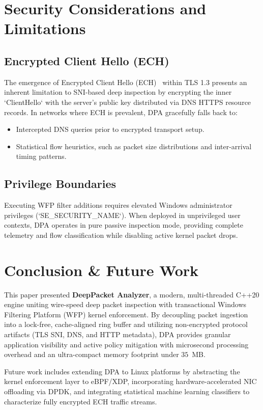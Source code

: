 \documentclass[conference]{IEEEtran}
\begin{document}
\section{Security Considerations and Limitations}
\label{sec:security}
\subsection{Encrypted Client Hello (ECH)}
The emergence of Encrypted Client Hello (ECH)~\cite{rescorla2020encrypted} within TLS 1.3 presents an inherent limitation to SNI-based deep inspection by encrypting the inner `ClientHello` with the server's public key distributed via DNS HTTPS resource records. In networks where ECH is prevalent, DPA gracefully falls back to:
\begin{itemize}
    \item Intercepted DNS queries prior to encrypted transport setup.
    \item Statistical flow heuristics, such as packet size distributions and inter-arrival timing patterns.
\end{itemize}

\subsection{Privilege Boundaries}
Executing WFP filter additions requires elevated Windows administrator privileges (`SE_SECURITY_NAME`). When deployed in unprivileged user contexts, DPA operates in pure passive inspection mode, providing complete telemetry and flow classification while disabling active kernel packet drops.

\section{Conclusion \& Future Work}
\label{sec:conclusion}
This paper presented \textbf{DeepPacket Analyzer}, a modern, multi-threaded C++20 engine uniting wire-speed deep packet inspection with transactional Windows Filtering Platform (WFP) kernel enforcement. By decoupling packet ingestion into a lock-free, cache-aligned ring buffer and utilizing non-encrypted protocol artifacts (TLS SNI, DNS, and HTTP metadata), DPA provides granular application visibility and active policy mitigation with microsecond processing overhead and an ultra-compact memory footprint under $35$~MB.

Future work includes extending DPA to Linux platforms by abstracting the kernel enforcement layer to eBPF/XDP, incorporating hardware-accelerated NIC offloading via DPDK, and integrating statistical machine learning classifiers to characterize fully encrypted ECH traffic streams.
\end{document}
